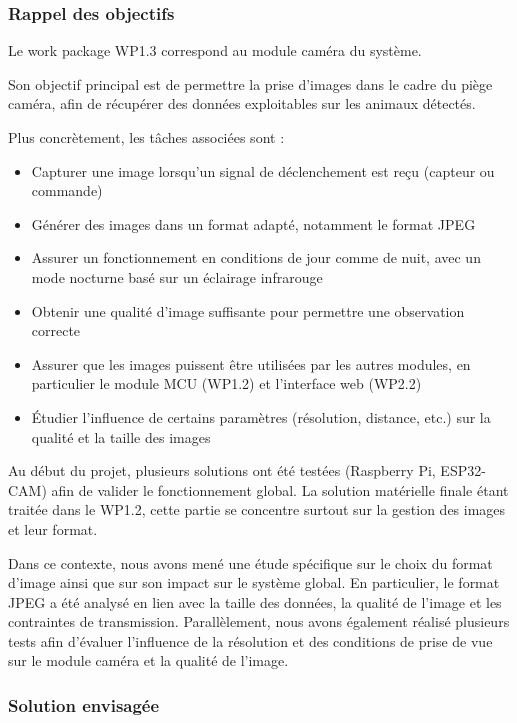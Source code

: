 ﻿\documentclass[11pt]{article}
\begin{document}
\subsubsection{Rappel des objectifs}

Le work package WP1.3 correspond au module caméra du système.

Son objectif principal est de permettre la prise d’images dans le cadre du piège caméra, afin de récupérer des données exploitables sur les animaux détectés.

Plus concrètement, les tâches associées sont :

\begin{itemize}
\item Capturer une image lorsqu’un signal de déclenchement est reçu (capteur ou commande)
\item Générer des images dans un format adapté, notamment le format JPEG
\item Assurer un fonctionnement en conditions de jour comme de nuit, avec un mode nocturne basé sur un éclairage infrarouge
\item Obtenir une qualité d’image suffisante pour permettre une observation correcte
\item Assurer que les images puissent être utilisées par les autres modules, en particulier le module MCU (WP1.2) et l’interface web (WP2.2)
\item Étudier l’influence de certains paramètres (résolution, distance, etc.) sur la qualité et la taille des images
\end{itemize}

Au début du projet, plusieurs solutions ont été testées (Raspberry Pi, ESP32-CAM) afin de valider le fonctionnement global. La solution matérielle finale étant traitée dans le WP1.2, cette partie se concentre surtout sur la gestion des images et leur format.

Dans ce contexte, nous avons mené une étude spécifique sur le choix du format d’image ainsi que sur son impact sur le système global. En particulier, le format JPEG a été analysé en lien avec la taille des données, la qualité de l’image et les contraintes de transmission. Parallèlement, nous avons également réalisé plusieurs tests afin d’évaluer l’influence de la résolution et des conditions de prise de vue sur le module caméra et la qualité de l’image.

\subsubsection{Solution envisagée}
\end{document}
